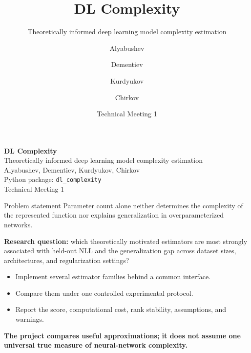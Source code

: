 \documentclass[aspectratio=169,notheorems]{beamer}
\title{DL Complexity}
\subtitle{Theoretically informed deep learning model complexity estimation}
\author{Alyabushev \and Dementiev \and Kurdyukov \and Chirkov}
\date{Technical Meeting 1}
\newcommand{\code}[1]{\texttt{#1}}
\newcommand{\take}[1]{%
  \par\vspace{0.35em}{\color{myblue}\hrule height 0.6pt}%
  \vspace{0.25em}\noindent\textbf{#1}\par}
\begin{document}
\begin{frame}[plain]
\centering
\vspace*{1.2em}
{\LARGE\bfseries\color{myblue} DL Complexity}\\[0.5em]
{\large Theoretically informed deep learning model complexity estimation}\\[2.0em]
Alyabushev, Dementiev, Kurdyukov, Chirkov\\[0.4em]
{\small Python package: \code{dl\_complexity}}\\[2.0em]
Technical Meeting 1
\end{frame}

\begin{frame}{Problem statement}
\small
Parameter count alone neither determines the complexity of the represented function nor
explains generalization in overparameterized networks.

\medskip
\textbf{Research question:} which theoretically motivated estimators are most strongly
associated with held-out NLL and the generalization gap across dataset sizes,
architectures, and regularization settings?

\medskip
\begin{itemize}\setlength{\itemsep}{0.45em}
  \item Implement several estimator families behind a common interface.
  \item Compare them under one controlled experimental protocol.
  \item Report the score, computational cost, rank stability, assumptions, and warnings.
\end{itemize}

\take{The project compares useful approximations; it does not assume one universal
true measure of neural-network complexity.}
\end{frame}
\end{document}
